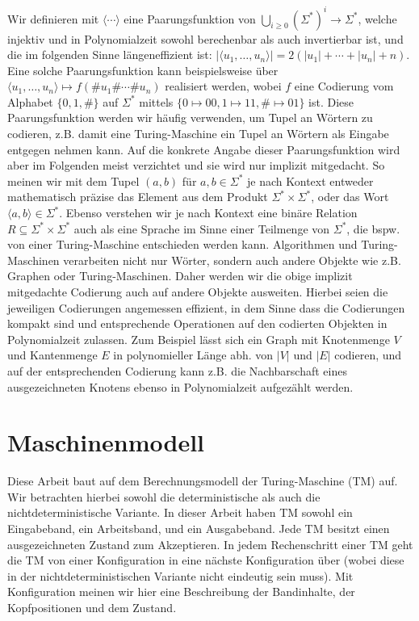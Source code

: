 Wir definieren mit $\langle\cdots\rangle$ eine Paarungsfunktion von $\bigcup_{i\geq 0} (\Sigma^*)^i \to \Sigma^*$, welche injektiv und in Polynomialzeit sowohl berechenbar als auch invertierbar ist, und die im folgenden Sinne längeneffizient ist: $|\langle u_1, \dots, u_n\rangle| = 2(|u_1|+\cdots+|u_n|+n)$. Eine solche Paarungsfunktion kann beispielsweise über $\langle u_1, \dots, u_n\rangle\mapsto f(\#u_1\#\cdots\#u_n)$ realisiert werden, wobei $f$ eine Codierung vom Alphabet $\{0,1,\#\}$ auf $\Sigma^*$ mittels $\{0\mapsto 00, 1\mapsto 11, \#\mapsto 01\}$ ist.
Diese Paarungsfunktion werden wir häufig verwenden, um Tupel an Wörtern zu codieren, z.B. damit eine Turing-Maschine ein Tupel an Wörtern als Eingabe entgegen nehmen kann. Auf die konkrete Angabe dieser Paarungsfunktion wird aber im Folgenden meist verzichtet und sie wird nur implizit mitgedacht. So meinen wir mit dem Tupel $(a,b)$ für $a,b\in\Sigma^*$ je nach Kontext entweder mathematisch präzise das Element aus dem Produkt $\Sigma^*\times\Sigma^*$, oder das Wort $\langle a,b\rangle\in\Sigma^*$. Ebenso verstehen wir je nach Kontext eine binäre Relation $R\subseteq\Sigma^*\times\Sigma^*$ auch als eine Sprache im Sinne einer Teilmenge von $\Sigma^*$, die bspw. von einer Turing-Maschine entschieden werden kann.
Algorithmen und Turing-Maschinen verarbeiten nicht nur Wörter, sondern auch andere Objekte wie z.B. Graphen oder Turing-Maschinen.
Daher werden wir die obige implizit mitgedachte Codierung auch auf andere Objekte ausweiten. Hierbei seien die jeweiligen Codierungen angemessen effizient, in dem Sinne dass die Codierungen kompakt sind und entsprechende Operationen auf den codierten Objekten in Polynomialzeit zulassen. Zum Beispiel lässt sich ein Graph mit Knotenmenge $V$ und Kantenmenge $E$ in polynomieller Länge abh. von $|V|$ und $|E|$ codieren, und auf der entsprechenden Codierung kann z.B. die Nachbarschaft eines ausgezeichneten Knotens ebenso in Polynomialzeit aufgezählt werden.

\vspace{0pt plus 2ex}
\section{Maschinenmodell}\label{sec:prelim-machines}

Diese Arbeit baut auf dem Berechnungsmodell der Turing-Maschine (TM) auf. Wir betrachten hierbei sowohl die deterministische als auch die nichtdeterministische Variante. In dieser Arbeit haben TM sowohl ein Eingabeband, ein Arbeitsband, und ein Ausgabeband. Jede TM besitzt einen ausgezeichneten Zustand zum Akzeptieren. In jedem Rechenschritt einer TM geht die TM von einer Konfiguration in eine nächste Konfiguration über (wobei diese in der nichtdeterministischen Variante nicht eindeutig sein muss). Mit Konfiguration meinen wir hier eine Beschreibung der Bandinhalte, der Kopfpositionen und dem Zustand.

